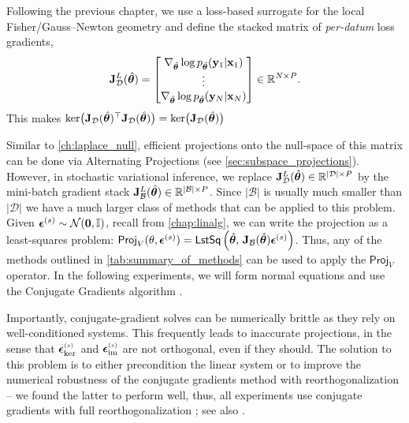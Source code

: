 Following the previous chapter, we use a loss-based surrogate for the local Fisher/Gauss--Newton geometry and define the stacked matrix of \emph{per-datum} loss gradients,
\begin{align}
\mathbf{J}^L_{\mathcal D}(\hat{\bm{\theta}})
=
\begin{bmatrix}
    \nabla_{\hat{\bm{\theta}}} \log p_{\hat{\bm{\theta}}}(\mathbf{y}_1|\mathbf{x}_1) \\
    \vdots \\
    \nabla_{\hat{\bm{\theta}}} \log p_{\hat{\bm{\theta}}}(\mathbf{y}_N|\mathbf{x}_N)
\end{bmatrix}
\in \mathbb{R}^{N \times P}.
\end{align}
This makes \(\ker\!\big(\mathbf{J}_{\mathcal D}(\hat{\bm{\theta}})^{\top} \mathbf{J}_{\mathcal D}(\hat{\bm{\theta}})\big)=\ker\!\big(\mathbf{J}_{\mathcal D}(\hat{\bm{\theta}})\big)\)

Similar to \cref{ch:laplace_null}, efficient projections onto the null-space of this matrix can be done via Alternating Projections (see \cref{sec:subspace_projections}). However, in stochastic variational inference, we replace $\mathbf{J}^L_{\mathcal D}(\hat{\bm{\theta}}) \in \mathbb{R}^{|\mathcal D|\times P}$ by the mini-batch gradient stack $\mathbf{J}^L_{\mathcal B}(\hat{\bm{\theta}})\in\mathbb{R}^{|\mathcal B|\times P}$. Since $|\mathcal B|$ is usually much smaller than $|\mathcal D|$ we have a much larger class of methods that can be applied to this problem. Given $\bm{\epsilon}^{(s)}\sim\mathcal N(\bm{0},\mathbb I)$, recall from \cref{chap:linalg}, we can write the projection as a least-squares problem: $\textsf{Proj}_V(\theta, \bm{\epsilon}^{(s)}) = \textsf{LstSq}\,\Big(\hat{\bm{\theta}},\,\mathbf{J}_{\mathcal B}(\hat{\bm{\theta}})\bm{\epsilon}^{(s)}\Big)$. Thus, any of the methods outlined in \cref{tab:summary_of_methods} can be used to apply the $\textsf{Proj}_V$ operator. In the following experiments, we will form normal equations and use the Conjugate Gradients algorithm \citep{hestenes1952methods}. 

Importantly, conjugate-gradient solves can be numerically brittle as they rely on well-conditioned systems.
This frequently leads to inaccurate projections, in the sense that $\bm{\epsilon}_{\ker}^{\scriptscriptstyle (s)}$ and $\bm{\epsilon}_{\operatorname{im}}^{\scriptscriptstyle (s)}$ are not orthogonal, even if they should.
The solution to this problem is to either precondition the linear system or to improve the numerical robustness of the conjugate gradients method with reorthogonalization -- we found the latter to perform well, thus, all experiments use conjugate gradients with full reorthogonalization \citep{gratton2021minimizing};
see also \citet{maddox2022low}.

